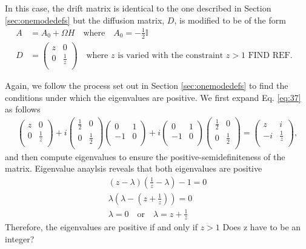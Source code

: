 \documentclass[11pt,a4paper]{article}
\numberwithin{equation}{section}
\begin{document}
	In this case, the drift matrix is identical to the one described in Section \ref{sec:onemodedefs} but the diffusion matrix, $D$, is modified to be of the form
	\begin{align*}
	A &= A_0 + \Omega H \quad\text{where}\quad A_0 = -\frac{1}{2}\mathbb{I}&\\
	D &= \begin{pmatrix}
	z & 0  \\
	0 & \frac{1}{z}\\
	\end{pmatrix} \quad\text{where $z$ is varied with the constraint $z>1$ FIND REF}.&
	\end{align*} 
	
	Again, we follow the process set out in Section \ref{sec:onemodedefs} to find the conditions under which  the eigenvalues are positive. We first expand Eq. \ref{eq:37} as follows
	\begin{align*}
	\begin{pmatrix}
	z & 0  \\
	0 & \frac{1}{z}\\
	\end{pmatrix} + i\begin{pmatrix}
	\frac{1}{2} & 0  \\
	0 & \frac{1}{2} \\
	\end{pmatrix}\begin{pmatrix}
	0 & 1  \\
	-1 & 0 \\
	\end{pmatrix} + i\begin{pmatrix}
	0 & 1  \\
	-1 & 0 \\
	\end{pmatrix}\begin{pmatrix}
	\frac{1}{2} & 0  \\
	0 & \frac{1}{2} \\
	\end{pmatrix}=
	\begin{pmatrix}
	z & i  \\
	-i & \frac{1}{z} \\
	\end{pmatrix},
	\end{align*}
	and then compute eigenvalues to ensure the positive-semidefiniteness of the matrix. Eigenvalue anaylsis reveals that both eigenvalues are positive
	\begin{align*}
	&(z- \lambda)(\frac{1}{z} - \lambda) - 1 = 0&\\
	&\lambda(\lambda - (z+ \frac{1}{z})) = 0&\\
	&\lambda = 0\quad\text{or}\quad\lambda= z+ \frac{1}{z}&
	\end{align*}
	Therefore, the eigenvalues are positive if and only if $z > 1$ \color{red}Does z have to be an integer?
	 		
\end{document}
